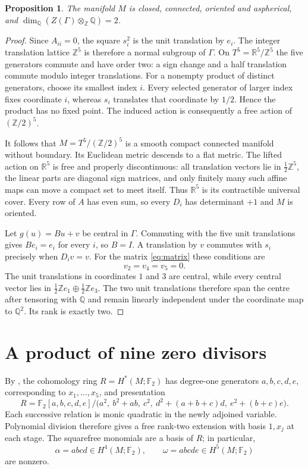 \documentclass[11pt]{amsart}
\newcommand{\F}{\mathbb F_2}
\newcommand{\R}{\mathbb R}
\newcommand{\Z}{\mathbb Z}
\newcommand{\Q}{\mathbb Q}
\newtheorem{proposition}[theorem]{Proposition}
\begin{document}
\begin{proposition}\label{prop:geometry}
The manifold $M$ is closed, connected, oriented and aspherical, and
$\dim_{\Q}(Z(\Gamma)\otimes_{\Z}\Q)=2$.
\end{proposition}
\begin{proof}
Since $A_{ii}=0$, the square $s_i^2$ is the unit translation by $e_i$.
The integer translation lattice $\Z^5$ is therefore a normal subgroup of
$\Gamma$. On $T^5=\R^5/\Z^5$ the five generators commute and have order two:
a sign change and a half translation commute modulo integer translations.
For a nonempty product of distinct generators, choose its smallest index $i$.
Every selected generator of larger index fixes coordinate $i$, whereas $s_i$
translates that coordinate by $1/2$. Hence the product has no fixed point.
The induced action is consequently a free action of $(\Z/2)^5$.

It follows that $M=T^5/(\Z/2)^5$ is a smooth compact connected manifold
without boundary. Its Euclidean metric descends to a flat metric. The lifted
action on $\R^5$ is free and properly discontinuous: all translation vectors
lie in $\tfrac12\Z^5$, the linear parts are diagonal sign matrices, and only
finitely many such affine maps can move a compact set to meet itself. Thus
$\R^5$ is its contractible universal cover. Every row of $A$ has even sum,
so every $D_i$ has determinant $+1$ and $M$ is oriented.

Let $g(u)=Bu+v$ be central in $\Gamma$. Commuting with the five unit
translations gives $Be_i=e_i$ for every $i$, so $B=I$. A translation by $v$
commutes with $s_i$ precisely when $D_i v=v$. For the matrix
\eqref{eq:matrix} these conditions are
\[
 v_2=v_4=v_5=0.
\]
The unit translations in coordinates $1$ and $3$ are central, while every
central vector lies in $\tfrac12\Z e_1\oplus\tfrac12\Z e_3$. The two unit
translations therefore span the centre after tensoring with $\Q$ and remain
linearly independent under the coordinate map to $\Q^2$. Its rank is exactly
two.
\end{proof}

\section{A product of nine zero divisors}
By \cite[Lemma~2.1]{KM}, the cohomology ring $R=H^*(M;\F)$ has degree-one
generators $a,b,c,d,e$, corresponding to $x_1,\ldots,x_5$, and presentation
\begin{equation}\label{eq:ring}
 R=\F[a,b,c,d,e]\big/
 \bigl(a^2,\ b^2+ab,\ c^2,\ d^2+(a+b+c)d,\ e^2+(b+c)e\bigr).
\end{equation}
Each successive relation is monic quadratic in the newly adjoined variable.
Polynomial division therefore gives a free rank-two extension with basis
$1,x_j$ at each stage. The squarefree monomials are a basis of $R$; in
particular,
\[
 \alpha=abcd\in H^4(M;\F),\qquad
 \omega=abcde\in H^5(M;\F)
\]
are nonzero.
\end{document}
